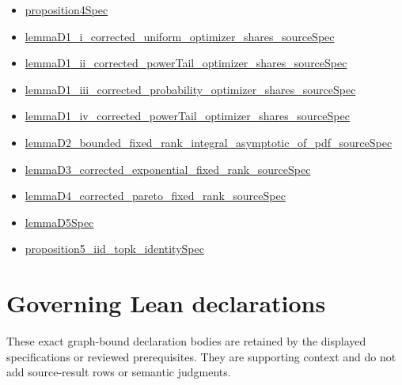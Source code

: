 \documentclass[10pt]{article}
\begin{document}
\begin{itemize}[leftmargin=1.2em]
\begin{itemize}[leftmargin=1.2em]
\item \hyperlink{source-claim-28a8fb49d83f5d5a}{proposition4\allowbreak{}Spec}
\item \hyperlink{source-claim-fa631b15a4a1176a}{lemma\allowbreak{}D1\_\allowbreak{}i\_\allowbreak{}corrected\_\allowbreak{}uniform\_\allowbreak{}optimizer\_\allowbreak{}shares\_\allowbreak{}source\allowbreak{}Spec}
\item \hyperlink{source-claim-f95d0c81ab1b47f3}{lemma\allowbreak{}D1\_\allowbreak{}ii\_\allowbreak{}corrected\_\allowbreak{}power\allowbreak{}Tail\_\allowbreak{}optimizer\_\allowbreak{}shares\_\allowbreak{}source\allowbreak{}Spec}
\item \hyperlink{source-claim-3f921e813126282a}{lemma\allowbreak{}D1\_\allowbreak{}iii\_\allowbreak{}corrected\_\allowbreak{}probability\_\allowbreak{}optimizer\_\allowbreak{}shares\_\allowbreak{}source\allowbreak{}Spec}
\item \hyperlink{source-claim-30cff96f226dc581}{lemma\allowbreak{}D1\_\allowbreak{}iv\_\allowbreak{}corrected\_\allowbreak{}power\allowbreak{}Tail\_\allowbreak{}optimizer\_\allowbreak{}shares\_\allowbreak{}source\allowbreak{}Spec}
\item \hyperlink{source-claim-7237c50e8bcf2059}{lemma\allowbreak{}D2\_\allowbreak{}bounded\_\allowbreak{}fixed\_\allowbreak{}rank\_\allowbreak{}integral\_\allowbreak{}asymptotic\_\allowbreak{}of\_\allowbreak{}pdf\_\allowbreak{}source\allowbreak{}Spec}
\item \hyperlink{source-claim-dcffa0731fd7e8dc}{lemma\allowbreak{}D3\_\allowbreak{}corrected\_\allowbreak{}exponential\_\allowbreak{}fixed\_\allowbreak{}rank\_\allowbreak{}source\allowbreak{}Spec}
\item \hyperlink{source-claim-49105a2b2538ba9d}{lemma\allowbreak{}D4\_\allowbreak{}corrected\_\allowbreak{}pareto\_\allowbreak{}fixed\_\allowbreak{}rank\_\allowbreak{}source\allowbreak{}Spec}
\item \hyperlink{source-claim-477ea495052a0969}{lemma\allowbreak{}D5\allowbreak{}Spec}
\item \hyperlink{source-claim-4a13a0b223d63917}{proposition5\_\allowbreak{}iid\_\allowbreak{}topk\_\allowbreak{}identity\allowbreak{}Spec}
\end{itemize}
\end{itemize}

\clearpage
\hypertarget{governing-declaration-section-5ef5ef0364b6939c}{}
\section*{Governing Lean declarations}
These exact graph-bound declaration bodies are retained by the displayed specifications or reviewed prerequisites. They are supporting context and do not add source-result rows or semantic judgments.
\hypertarget{governing-declaration-6972368b41f26c5a}{}
\end{document}
